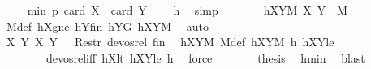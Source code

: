 \begin{isabellebody}
\ \isamarkupfalse%
\ {\isachardoublequoteopen}{\isachardot}{\kern0pt}{\isachardot}{\kern0pt}{\isachardot}{\kern0pt}\ {\isasymle}\ min\ p\ {\isacharparenleft}{\kern0pt}card\ {\isacharquery}{\kern0pt}X{}\ {\isacharplus}{\kern0pt}\ card\ {\isacharquery}{\kern0pt}Y{}\ {\isacharminus}{\kern0pt}\ {}{\isacharparenright}{\kern0pt}{\isachardoublequoteclose}\ \isamarkupfalse%
\ h\ \isamarkupfalse%
\ simp\isanewline
\ \ \ \ \isamarkupfalse%
\ \isamarkupfalse%
\ hXY{}M{\isacharcolon}{\kern0pt}\ {\isachardoublequoteopen}{\isacharparenleft}{\kern0pt}{\isacharquery}{\kern0pt}X{}{\isacharcomma}{\kern0pt}\ {\isacharquery}{\kern0pt}Y{}{\isacharparenright}{\kern0pt}\ {\isasymin}\ M{\isachardoublequoteclose}\ \isamarkupfalse%
\ M{\isacharunderscore}{\kern0pt}def\ hXgne\ hY{}fin\ hY{}G\ hXYM\ \isamarkupfalse%
\ auto\isanewline
\ \ \ \ \isamarkupfalse%
\ \isamarkupfalse%
\ {\isachardoublequoteopen}{\isacharparenleft}{\kern0pt}{\isacharparenleft}{\kern0pt}{\isacharquery}{\kern0pt}X{}{\isacharcomma}{\kern0pt}\ {\isacharquery}{\kern0pt}Y{}{\isacharparenright}{\kern0pt}{\isacharcomma}{\kern0pt}\ {\isacharparenleft}{\kern0pt}X{\isacharcomma}{\kern0pt}\ Y{\isacharparenright}{\kern0pt}{\isacharparenright}{\kern0pt}\ {\isasymin}\ \ Restr\ devos{\isacharunderscore}{\kern0pt}rel\ {\isacharquery}{\kern0pt}fin{\isachardoublequoteclose}\ \isamarkupfalse%
\ hXYM\ M{\isacharunderscore}{\kern0pt}def\ hXY{}M\ h\ hXY{}le\ \isanewline
\ \ \ \ \ \ \ \ devos{\isacharunderscore}{\kern0pt}rel{\isacharunderscore}{\kern0pt}iff\ hX{}lt\ hXY{}le\ h\ \isamarkupfalse%
\ force\isanewline
\ \ \ \ \isamarkupfalse%
\ \isamarkupfalse%
\ {\isacharquery}{\kern0pt}thesis\ \isamarkupfalse%
\ hmin\ \isamarkupfalse%
\ blast\isanewline
\ \ \isamarkupfalse%
\isanewline
{}\isamarkupfalse%
%
\endisatagproof
{\isafoldproof}%
%
\isadelimproof
\isanewline
%
\endisadelimproof
\isanewline
%
\isadelimtheory
\isanewline
%
\endisadelimtheory
%
\isatagtheory
{}\isamarkupfalse%
%
\endisatagtheory
{\isafoldtheory}%
%
\isadelimtheory
%
\endisadelimtheory
%
\end{isabellebody}%
\endinput

